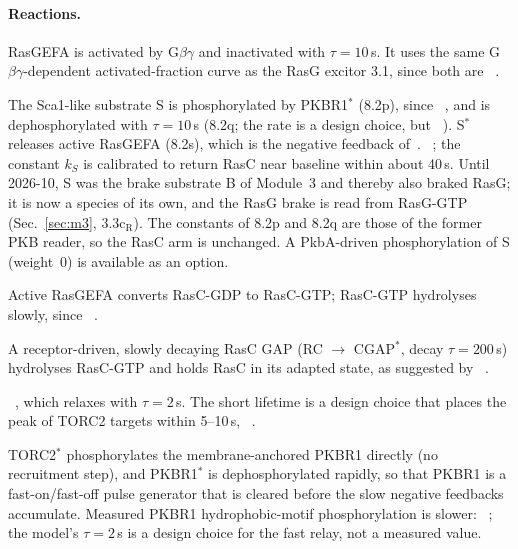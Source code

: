 \paragraph{Reactions.}
\begin{description}\itemsep0pt
\item[8.1/8.2] RasGEFA is activated by G$\beta\gamma$ and inactivated with $\tau=10$\,s. It uses the same G$\beta\gamma$-dependent activated-fraction curve as the RasG excitor 3.1, since both are ~\cite{kae2007}.
\item[8.2p/8.2q/8.2s] The Sca1-like substrate S is phosphorylated by PKBR1$^*$ (8.2p), since ~\cite{charest2010}, and is dephosphorylated with $\tau=10$\,s (8.2q; the rate is a design choice, but ~\cite{charest2010}). S$^*$ releases active RasGEFA (8.2s), which is the negative feedback of~\cite{charest2010}. ~\cite{charest2010}; the constant $k_S$ is calibrated to return RasC near baseline within about 40\,s. Until 2026-10, S was the brake substrate B of Module~3 and thereby also braked RasG; it is now a species of its own, and the RasG brake is read from RasG-GTP (Sec.~\ref{sec:m3}, 3.3c$_\mathrm{R}$). The constants of 8.2p and 8.2q are those of the former PKB reader, so the RasC arm is unchanged. A PkbA-driven phosphorylation of S (weight~0) is available as an option.
\item[8.3/8.4] Active RasGEFA converts RasC-GDP to RasC-GTP; RasC-GTP hydrolyses slowly, since ~\cite{kae2004}.
\item[8.4b--d] A receptor-driven, slowly decaying RasC GAP (RC $\to$ CGAP$^*$, decay $\tau=200$\,s) hydrolyses RasC-GTP and holds RasC in its adapted state, as suggested by ~\cite{kae2007}.
\item[8.5/8.6] ~\cite{cai2010}, which relaxes with $\tau=2$\,s. The short lifetime is a design choice that places the peak of TORC2 targets within 5--10\,s, ~\cite{charest2010}.
\item[8b.1/8b.2] TORC2$^*$ phosphorylates the membrane-anchored PKBR1 directly (no recruitment step), and PKBR1$^*$ is dephosphorylated rapidly, so that PKBR1 is a fast-on/fast-off pulse generator that is cleared before the slow negative feedbacks accumulate. Measured PKBR1 hydrophobic-motif phosphorylation is slower: ~\cite{cai2010}; the model's $\tau=2$\,s is a design choice for the fast relay, not a measured value.

\end{description}
